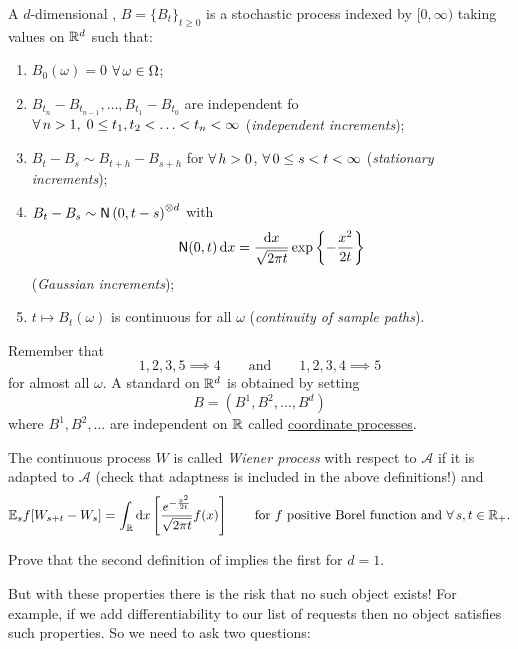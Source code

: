 \documentclass[12pt]{report}
\begin{document}
\begin{definition}
	A $d$-dimensional \bwm, $B={\{B_{t}\}}_{t\geq 0}$ is a stochastic process indexed by $[0,\infty)$ taking values on $\mathbb{R}^{d}$ such that:
	\begin{enumerate}
		\item $B_{0}(\omega)=0$ \as{} $\forall\,\omega\in\Omega$;
		\item $B_{t_{n}}-B_{t_{n-1}},\ldots,B_{t_{1}}-B_{t_{0}}$ are independent fo $\forall\, n>1,\;0\leq t_{1},t_{2}<\ldots<t_{n}<\infty$ (\emph{independent increments});
		\item $B_{t}-B_{s}\sim B_{t+h}-B_{s+h}$ for $\forall\, h>0$, $\forall\, 0\leq s<t<\infty$ (\emph{stationary increments});
		\item $B_{t}-B_{s}\sim\mathsf{N}\left(0,t-s\right)^{\otimes d}$ with 
		\begin{equation*}
			\mathsf{N}(0,t)\mathop{}\!\mathrm{d} x =\frac{\mathop{}\!\mathrm{d} x}{\sqrt{2\pi t}}\exp\left\{-\frac{x^{2}}{2t}\right\}
		\end{equation*} (\emph{Gaussian increments});
		\item $t\mapsto B_{t}(\omega)$ is continuous for all $\omega$ (\emph{continuity of sample paths}).
	\end{enumerate}
\end{definition}
Remember that 
\begin{equation*}
	1,2,3,5\implies 4\qquad\text{and}\qquad1,2,3,4\implies 5
\end{equation*}
for almost all $\omega$. A standard \bwm{} on $\mathbb{R}^{d}$ is obtained by setting
\begin{equation*}
	B=(B^{1},B^{2},\ldots,B^{d})
\end{equation*}
where $B^{1},B^{2},\ldots$ are independent \bwm{} on $\mathbb{R}$ called \ul{coordinate processes}.
\begin{definition}
	The continuous process $W$ is called \emph{Wiener process} with respect to $\mathscr{A}$ if it is adapted to $\mathscr{A}$ (check that adaptness is included in the above definitions!) and 
	\begin{equation*}
		\mathbb{E}_{s}f[W_{s+t}-W_{s}]=\int_{\mathbb{R}}\mathop{}\!\mathrm{d} x\left[\frac{e^{-\frac{x^{2}}{2t}}}{\sqrt{2\pi t}}f(x)\right]\qquad\text{for $f$ positive Borel function and }\forall\, s,t\in\mathbb{R}_{+}.
	\end{equation*}
\end{definition}
\begin{exercise}
	Prove that the second definition of \bwm{} implies the first for $d=1$.
\end{exercise}
But with these properties there is the risk that no such object exists! For example, if we add differentiability to our list of requests then no object satisfies such properties. So we need to ask two questions:
\end{document}
